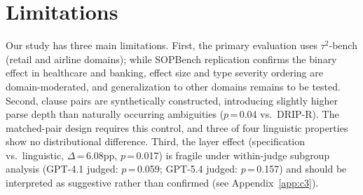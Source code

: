\documentclass[11pt,a4paper]{article}
\begin{document}
\section*{Limitations}

Our study has three main limitations.
First, the primary evaluation uses $\tau^2$-bench (retail and airline domains); while SOPBench replication confirms the binary effect in healthcare and banking, effect size and type severity ordering are domain-moderated, and generalization to other domains remains to be tested.
Second, clause pairs are synthetically constructed, introducing slightly higher parse depth than naturally occurring ambiguities ($p$\,=\,0.04 vs.\ DRIP-R).
The matched-pair design requires this control, and three of four linguistic properties show no distributional difference.
Third, the layer effect (specification vs.\ linguistic, $\Delta$\,=\,6.08pp, $p$\,=\,0.017) is fragile under within-judge subgroup analysis (GPT-4.1 judged: $p$\,=\,0.059; GPT-5.4 judged: $p$\,=\,0.157) and should be interpreted as suggestive rather than confirmed (see Appendix~\ref{app:c3}).



\end{document}
